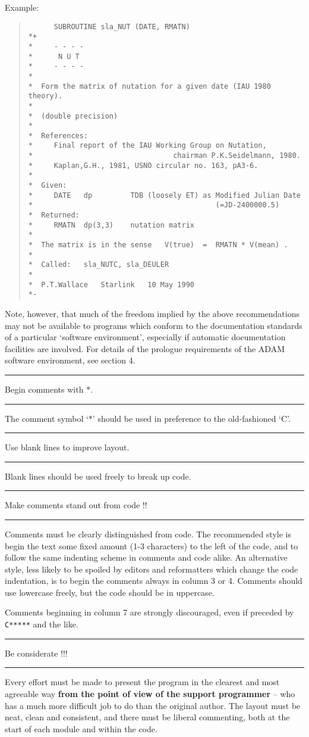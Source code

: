 \documentclass[twoside,11pt]{article}
\newcounter{sruleno}
\newcommand{\srule}[1]{
    \addtocounter{sruleno}{1}
    \goodbreak
    \rule[0.5ex]{\textwidth}{0.3mm}
    {\Large #1 \hfill {\thesruleno}}
    \rule[0.5ex]{\textwidth}{0.1mm}
}
\newcommand{\srule}[1]{
       \addtocounter{sruleno}{1}
       \begin{rawhtml} <HR> \end{rawhtml}
       {\Large \thesruleno}~~~~{\Large #1}
       \begin{rawhtml} <HR> \end{rawhtml}
       \end{tabular}
  }
\renewcommand{\_}{{\tt\char'137}}
\begin{document}
\goodbreak
Example:
\begin{quote}
\begin{footnotesize}
\begin{verbatim}
      SUBROUTINE sla_NUT (DATE, RMATN)
*+
*     - - - -
*      N U T
*     - - - -
*
*  Form the matrix of nutation for a given date (IAU 1980 theory).
*
*  (double precision)
*
*  References:
*     Final report of the IAU Working Group on Nutation,
*                                 chairman P.K.Seidelmann, 1980.
*     Kaplan,G.H., 1981, USNO circular no. 163, pA3-6.
*
*  Given:
*     DATE   dp         TDB (loosely ET) as Modified Julian Date
*                                           (=JD-2400000.5)
*  Returned:
*     RMATN  dp(3,3)    nutation matrix
*
*  The matrix is in the sense   V(true)  =  RMATN * V(mean) .
*
*  Called:   sla_NUTC, sla_DEULER
*
*  P.T.Wallace   Starlink   10 May 1990
*-
\end{verbatim}
\end{footnotesize}
\end{quote}
Note, however, that much of the freedom implied by the above recommendations 
may not be available to programs which conform to the documentation standards of
a particular `software environment', especially if automatic documentation
facilities are involved.
For details of the prologue requirements of the ADAM software environment, see
section 4.

\srule{Begin comments with $\ast$.}
The comment symbol `$\ast$' should be used in
preference to the old-fashioned `C'.

\srule{Use blank lines to improve layout.}
Blank lines should be used freely to break up code.

\srule{Make comments stand out from code !!}
Comments must be clearly distinguished from code.  The recommended
style is begin the text some fixed amount (1-3 characters) to the
left of the code, and to follow the same indenting scheme in
comments and code alike.  An alternative style, less likely
to be spoiled by editors and reformatters which change
the code indentation, is to begin the comments always in column
3 or 4.  Comments should use lowercase freely, but the code should
be in uppercase.

Comments beginning in column 7 are strongly discouraged, even if preceded by
\mbox{\tt{C*****}} and the like.
\srule{Be considerate !!!}
Every effort must be made to present the program in the clearest and most
agreeable way {\bf from the point
of view of the support programmer} -- who has a much
more difficult job to do than the original author.
The layout must be neat, clean and consistent, and there must
be liberal commenting, both at the start of each module and
within the code.
\end{document}
